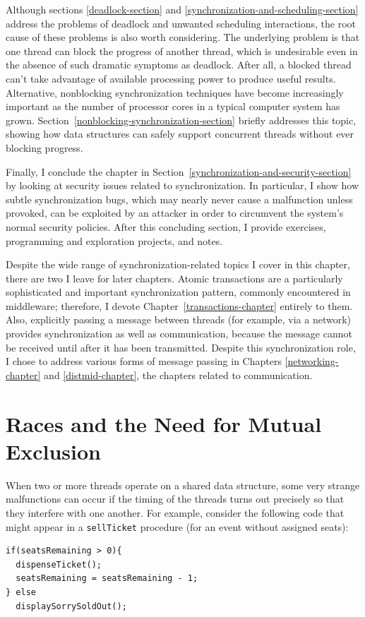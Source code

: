 Although sections \ref{deadlock-section} and \ref{synchronization-and-scheduling-section} 
address the problems of deadlock and unwanted scheduling interactions, the root 
cause of these problems is also worth considering.
The underlying problem is that
one thread can block the progress of another thread, which is undesirable
even in the absence of such dramatic symptoms as deadlock.  After all, a blocked thread can't take
advantage of available processing power to produce useful results.  
Alternative, nonblocking synchronization techniques have become increasingly important
as the number of processor cores in a typical computer system has grown.
Section~\ref{nonblocking-synchronization-section} briefly addresses this topic, 
showing how data structures can safely support concurrent threads without ever blocking progress.

Finally, I conclude the chapter in
Section~\ref{synchronization-and-security-section} by looking at security issues related
to synchronization.  In particular, I show how subtle synchronization
bugs, which may nearly never cause a malfunction unless provoked, can
be exploited by an attacker in order to circumvent the system's normal
security policies.
After this concluding section, I provide exercises, programming and exploration projects, and notes.

Despite the wide range of synchronization-related topics I cover in
this chapter, there are two I leave for later chapters.
Atomic transactions are a particularly sophisticated and important
synchronization pattern, commonly encountered in middleware;
therefore, I devote Chapter~\ref{transactions-chapter} entirely to them.  Also,
explicitly passing a message between threads (for example, via a network)
provides synchronization as well as communication, because the message
cannot be received until after it has been transmitted.  Despite this
synchronization role, I chose to address various forms of message
passing in Chapters \ref{networking-chapter} and
\ref{distmid-chapter}, the chapters related to communication.

\section{Races and the Need for Mutual Exclusion}\label{races-section}

When two or more threads operate on a shared data structure, some very
strange malfunctions can occur if the timing of the threads turns out
precisely so that they
interfere with one another.  For example, consider the following
code that might appear in a \verb|sellTicket| procedure (for an event
without assigned seats):
\begin{verbatim}
if(seatsRemaining > 0){
  dispenseTicket();
  seatsRemaining = seatsRemaining - 1;
} else
  displaySorrySoldOut();
\end{verbatim}

